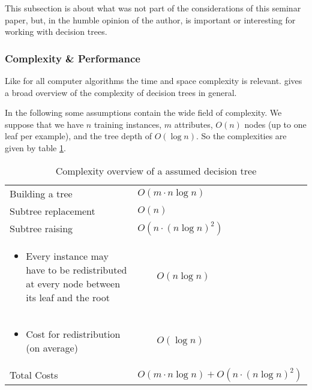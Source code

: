 This subsection is about what was not part of the considerations of this seminar paper, but, in the humble opinion of the author, is important or interesting for working with decision trees.

\subsubsection{Complexity \& Performance}

Like for all computer algorithms the time and space complexity is relevant. \cite{buhrman2002complexity} gives a broad overview of the complexity of decision trees in general. 

In the following some assumptions contain the wide field of complexity. We suppose that we have $n$ training instances, $m$ attributes, $O(n)$ nodes (up to one leaf per example), and the tree depth of $O(\log n)$. So the complexities are given by table \ref{tab:complexity}. 

\begin{table}[!h] \centering
\begin{tabular}{|p{6cm} | l|} \hline
Building a tree & $O(m \cdot n \log n )$ \\
Subtree replacement & $O(n)$ \\
Subtree raising & $O\left(n \cdot (n \log n)^2 \right)$ \\ 
\vspace*{-2em} \begin{itemize}\item \small{Every instance may have to be redistributed at every node
between its leaf and the root} \vspace*{-1em} \end{itemize} & $ \qquad O\left(n \log n \right)$ \\
\vspace*{-2em} \begin{itemize}\item \small{Cost for redistribution (on average)} \vspace*{-1em} \end{itemize} & $ \qquad O\left( \log n \right)$ \\ \hline \hline
Total Costs & $O(m \cdot n \log n ) + O\left(n \cdot (n \log n)^2 \right)$ \\ \hline
\end{tabular}
\caption{Complexity overview of a assumed decision tree}
\label{tab:complexity}
\end{table}

